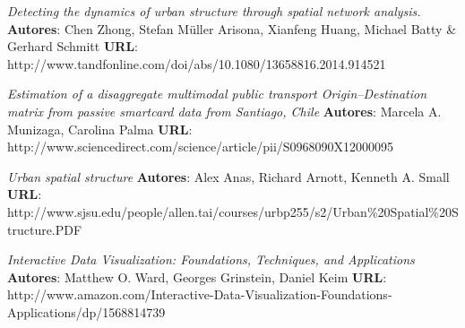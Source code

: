 \documentclass[itshape,12pt]{article}
\begin{document}
          \renewcommand{\section}[2]{} %
              \begin{thebibliography}{99}


               \emph{Detecting the dynamics of urban structure through spatial network analysis.}
          {\scriptsize \textbf{Autores}: Chen Zhong, Stefan Müller Arisona, Xianfeng Huang, Michael Batty \& Gerhard Schmitt}
          {\scriptsize \textbf{URL}: http://www.tandfonline.com/doi/abs/10.1080/13658816.2014.914521}


           \emph{Estimation of a disaggregate multimodal public transport Origin–Destination matrix from passive smartcard data from Santiago, Chile} 
          {\scriptsize \textbf{Autores}: Marcela A. Munizaga, Carolina Palma} 
          {\scriptsize \textbf{URL}: http://www.sciencedirect.com/science/article/pii/S0968090X12000095}


           \emph{Urban spatial structure} 
          {\scriptsize \textbf{Autores}: Alex Anas, Richard Arnott, Kenneth A. Small} 
          {\scriptsize \textbf{URL}: http://www.sjsu.edu/people/allen.tai/courses/urbp255/s2/Urban\%20Spatial\%20Structure.PDF}


           \emph{Interactive Data Visualization: Foundations, Techniques, and Applications} 
          {\scriptsize \textbf{Autores}:  Matthew O. Ward, Georges Grinstein, Daniel Keim} 
          {\scriptsize \textbf{URL}: http://www.amazon.com/Interactive-Data-Visualization-Foundations-Applications/dp/1568814739}


          \end{thebibliography}

          
\end{document}
